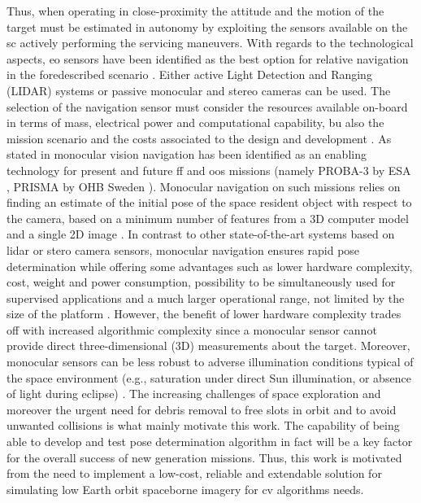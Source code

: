 Thus, when operating in close-proximity the attitude and the motion of the target must be estimated in autonomy by exploiting the sensors available on the \acrshort{sc} actively performing the servicing maneuvers.
With regards to the technological aspects, \acrfull{eo} sensors have been identified as the best option for relative navigation in the foredescribed scenario \cite{Opromolla2017} \cite{pesciolino}.
Either active Light Detection and Ranging (LIDAR) systems or passive monocular and stereo cameras can be used. The selection of the navigation sensor must consider the resources available on-board in terms of mass, electrical power and computational capability, bu also the mission scenario and the costs associated to the design and development \cite{clerc2012astrium} \cite{pesciolino}.
As stated in \cite{Sharma2016} monocular vision navigation has been identified as an enabling technology for present and future \acrshort{ff} and \acrshort{oos} missions (namely PROBA-3 by ESA \cite{Casti2019}, PRISMA by OHB Sweden \cite{2013Damico}).
Monocular navigation on such missions relies on finding an estimate of the initial pose of the space resident object with respect to the camera, based on a minimum number of features from a 3D computer model and a single 2D image \cite{Sharma2016}.
In contrast to other state-of-the-art systems based on \acrfull{lidar} or stero camera sensors, monocular navigation ensures rapid pose determination while offering some advantages such as lower hardware complexity, cost, weight and power consumption, possibility to be simultaneously used for supervised applications and a much larger operational range, not limited by the size of the platform \cite{Sharma2018} \cite{2016Ventura} \cite{pesciolino}.
However, the benefit of lower hardware complexity trades off with increased algorithmic complexity since a monocular sensor cannot provide direct three-dimensional (3D) measurements about the target.
Moreover, monocular sensors can be less robust to adverse illumination conditions typical of the space environment \cite{Volpe2017} (e.g., saturation under direct Sun illumination, or absence of light during eclipse) \cite{pesciolino}.
The increasing challenges of space exploration and moreover the urgent need for debris removal to free slots in orbit and to avoid unwanted collisions is what mainly motivate this work.
The capability of being able to develop and test pose determination algorithm in fact will be a key factor for the overall success of new generation missions. Thus, this work is motivated from the need to implement a low-cost, reliable and extendable solution for simulating low Earth orbit spaceborne imagery for \acrfull{cv} algorithms needs.

